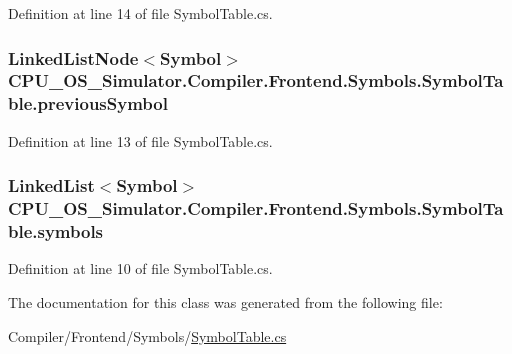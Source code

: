 Definition at line 14 of file Symbol\+Table.\+cs.

\hypertarget{class_c_p_u___o_s___simulator_1_1_compiler_1_1_frontend_1_1_symbols_1_1_symbol_table_a40b980c535cb45d6946762cb21112fb2}{}
\subsubsection[{previous\+Symbol}]{\setlength{\rightskip}{0pt plus 5cm}Linked\+List\+Node$<${\bf Symbol}$>$ C\+P\+U\+\_\+\+O\+S\+\_\+\+Simulator.\+Compiler.\+Frontend.\+Symbols.\+Symbol\+Table.\+previous\+Symbol\hspace{0.3cm}{\ttfamily [private]}}\label{class_c_p_u___o_s___simulator_1_1_compiler_1_1_frontend_1_1_symbols_1_1_symbol_table_a40b980c535cb45d6946762cb21112fb2}


Definition at line 13 of file Symbol\+Table.\+cs.

\hypertarget{class_c_p_u___o_s___simulator_1_1_compiler_1_1_frontend_1_1_symbols_1_1_symbol_table_a3a69b239234ec68d9225217c4a4b1eb7}{}
\subsubsection[{symbols}]{\setlength{\rightskip}{0pt plus 5cm}Linked\+List$<${\bf Symbol}$>$ C\+P\+U\+\_\+\+O\+S\+\_\+\+Simulator.\+Compiler.\+Frontend.\+Symbols.\+Symbol\+Table.\+symbols\hspace{0.3cm}{\ttfamily [private]}}\label{class_c_p_u___o_s___simulator_1_1_compiler_1_1_frontend_1_1_symbols_1_1_symbol_table_a3a69b239234ec68d9225217c4a4b1eb7}


Definition at line 10 of file Symbol\+Table.\+cs.



The documentation for this class was generated from the following file\+:\begin{DoxyCompactItemize}
\item 
Compiler/\+Frontend/\+Symbols/\hyperlink{_symbol_table_8cs}{Symbol\+Table.\+cs}\end{DoxyCompactItemize}
